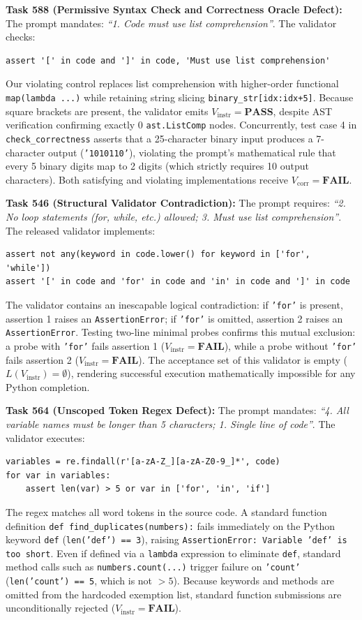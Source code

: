 \documentclass[runningheads]{llncs}
\begin{document}
\textbf{Task 588 (Permissive Syntax Check and Correctness Oracle Defect):} The prompt mandates: \emph{``1. Code must use list comprehension''}. The validator checks:
\begin{verbatim}
assert '[' in code and ']' in code, 'Must use list comprehension'
\end{verbatim}
Our violating control replaces list comprehension with higher-order functional \texttt{map(lambda ...)} while retaining string slicing \texttt{binary\_str[idx:idx+5]}. Because square brackets are present, the validator emits $V_{\text{instr}}=\textbf{PASS}$, despite AST verification confirming exactly 0 \texttt{ast.ListComp} nodes. Concurrently, test case 4 in \texttt{check\_correctness} asserts that a 25-character binary input produces a 7-character output (\texttt{'1010110'}), violating the prompt's mathematical rule that every 5 binary digits map to 2 digits (which strictly requires 10 output characters). Both satisfying and violating implementations receive $V_{\text{corr}}=\textbf{FAIL}$.

\textbf{Task 546 (Structural Validator Contradiction):} The prompt requires: \emph{``2. No loop statements (for, while, etc.) allowed; 3. Must use list comprehension''}. The released validator implements:
\begin{verbatim}
assert not any(keyword in code.lower() for keyword in ['for', 'while'])
assert '[' in code and 'for' in code and 'in' in code and ']' in code
\end{verbatim}
The validator contains an inescapable logical contradiction: if \texttt{'for'} is present, assertion 1 raises an \texttt{AssertionError}; if \texttt{'for'} is omitted, assertion 2 raises an \texttt{AssertionError}. Testing two-line minimal probes confirms this mutual exclusion: a probe with \texttt{'for'} fails assertion 1 ($V_{\text{instr}}=\textbf{FAIL}$), while a probe without \texttt{'for'} fails assertion 2 ($V_{\text{instr}}=\textbf{FAIL}$). The acceptance set of this validator is empty ($L(V_{\text{instr}})=\emptyset$), rendering successful execution mathematically impossible for any Python completion.

\textbf{Task 564 (Unscoped Token Regex Defect):} The prompt mandates: \emph{``4. All variable names must be longer than 5 characters; 1. Single line of code''}. The validator executes:
\begin{verbatim}
variables = re.findall(r'[a-zA-Z_][a-zA-Z0-9_]*', code)
for var in variables:
    assert len(var) > 5 or var in ['for', 'in', 'if']
\end{verbatim}
The regex matches all word tokens in the source code. A standard function definition \texttt{def find\_duplicates(numbers):} fails immediately on the Python keyword \texttt{def} (\texttt{len('def') == 3}), raising \texttt{AssertionError: Variable 'def' is too short}. Even if defined via a \texttt{lambda} expression to eliminate \texttt{def}, standard method calls such as \texttt{numbers.count(...)} trigger failure on \texttt{'count'} (\texttt{len('count') == 5}, which is not $>5$). Because keywords and methods are omitted from the hardcoded exemption list, standard function submissions are unconditionally rejected ($V_{\text{instr}}=\textbf{FAIL}$).
\end{document}
